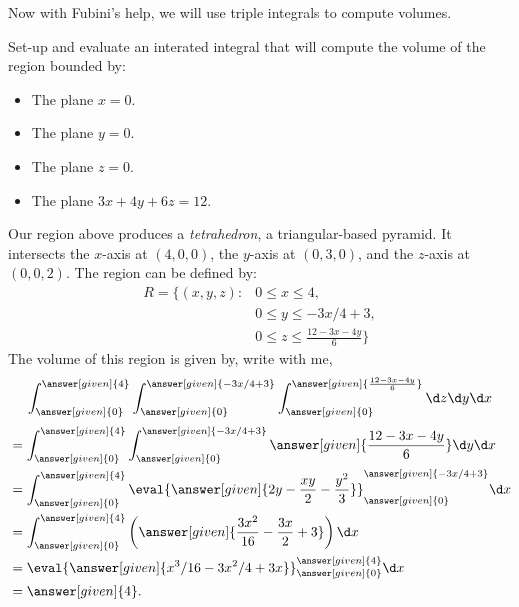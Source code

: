 \documentclass{ximera}
\begin{document}
Now with Fubini's help, we will use triple integrals to compute
volumes.

\begin{example}
  Set-up and evaluate an interated integral that will compute the
  volume of the region bounded by:
  \begin{itemize}
  \item The plane $x=0$.
  \item The plane $y=0$.
  \item The plane $z=0$.
  \item The plane $3x + 4y + 6z = 12$.
  \end{itemize}
  \begin{explanation}
    Our region above produces a
    \textit{tetrahedron}, a triangular-based
    pyramid. It intersects the $x$-axis at $(4,0,0)$, the $y$-axis at
    $(0,3,0)$, and the $z$-axis at $(0,0,2)$.  The region can be
    defined by:
    \begin{align*}
      R=\Big\{(x,y,z):&0\leq x\leq 4, \\
      &0\leq y\leq -3x/4+3, \\
      &0\leq z \leq \frac{12-3x-4y}{6}\Big\}
    \end{align*}
    The volume of this region is given by, write with me, 
    \[
    \int_{\answer[given]{0}}^{\answer[given]{4}} \int_{\answer[given]{0}}^{\answer[given]{-3x/4+3}} \int_{\answer[given]{0}}^{\answer[given]{\frac{12-3x-4y}{6}}}\d z \d y\d x 
    \]
    \begin{align*}
      &=\int_{\answer[given]{0}}^{\answer[given]{4}} \int_{\answer[given]{0}}^{\answer[given]{-3x/4+3}} \answer[given]{\frac{12-3x-4y}{6}} \d y \d x\\
      &= \int_{\answer[given]{0}}^{\answer[given]{4}}  \eval{\answer[given]{2y-\frac{xy}{2}-\frac{y^2}{3}}}_{\answer[given]{0}}^{\answer[given]{-3x/4+3}} \d x\\
      &= \int_{\answer[given]{0}}^{\answer[given]{4}}  \left(\answer[given]{\frac{3x^2}{16} -\frac{3x}{2}+3}\right) \d x\\
      &= \eval{\answer[given]{x^3/16-3x^2/4+3x}}_{\answer[given]{0}}^{\answer[given]{4}} \d x\\
      &=\answer[given]{4}.
    \end{align*}    
  \end{explanation}
\end{example}
\end{document}

